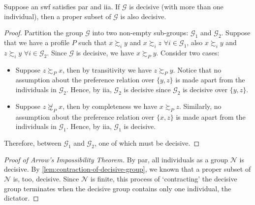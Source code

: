 \documentclass[a4paper]{article}
\begin{document}
\begin{multicols}{2}
\begin{lemma}\label{lem:contraction-of-decisive-group}
	Suppose an \gls*{swf} satisfies \gls*{par} and \gls*{iia}.
	If $\mathcal{G}$ is decisive (with more than one individual),
	then a proper subset of $\mathcal{G}$ is also decisive.
\end{lemma}

\begin{proof}
	Partition the group $\mathcal{G}$ into two non-empty sub-groups: $\mathcal{G}_1$ and $\mathcal{G}_2$.
	Suppose that we have a profile $P$ such that
	$x\succsim_i y$ and $x\succsim_i z$ $\forall i \in\mathcal{G}_1$, also
	$x\succsim_i y$ and $z\succsim_i y$ $\forall i \in\mathcal{G}_2$.
	Since $\mathcal{G}$ is decisive, we have $x\succsim_P y$.
	Consider two cases:
	\begin{itemize}
		\item
			Suppose $z\succsim_P x$, then by transitivity we have $z\succsim_P y$.
			Notice that no assumption about the preference relation over $\{y,z\}$
			is made apart from the individuals in $\mathcal{G}_2$.
			Hence, by \gls*{iia}, $\mathcal{G}_2$ is decisive since $\mathcal{G}_2$ is decisive over $\{y,z\}$.
		\item
			Suppose $z\not\succsim_P x$, then by completeness we have $x\succsim_P z$.
			Similarly, no assumption about the preference relation over $\{x,z\}$
			is made apart from the individuals in $\mathcal{G}_1$.
			Hence, by \gls*{iia}, $\mathcal{G}_1$ is decisive.
	\end{itemize}
	Therefore, between $\mathcal{G}_1$ and $\mathcal{G}_2$, one of which must be decisive.
\end{proof}

\begin{proof}[Proof of Arrow's Impossibility Theorem]
	By \gls*{par}, all individuals as a group $\mathcal{N}$ is decisive.
	By \autoref{lem:contraction-of-decisive-group},
	we known that a proper subset of $\mathcal{N}$ is, too, decisive.
	Since $\mathcal{N}$ is finite,
	this process of `contracting' the decisive group terminates when the decisive group contains only one individual,
	the dictator.
\end{proof}

\end{multicols}
\end{document}
